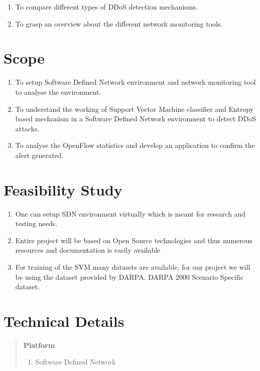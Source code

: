 \documentclass[12pt,a4paper,final]{article}
\begin{document}
\begin{flushleft}
\begin{enumerate}
\item
To compare different types of DDoS detection mechanisms.

\item
To grasp an overview about the different network monitoring tools.
\end{enumerate}

\noindent
\section{Scope}
\begin{enumerate}
\item
To setup Software Defined Network environment and network monitoring tool to analyse the environment.
\item
To understand the working of Support Vector Machine classifier and Entropy based mechanism in a Software Defined Network environment to detect DDoS attacks.
\item
To analyse the OpenFlow statistics and develop an application to confirm the alert generated.
\end{enumerate}

\noindent
\section{Feasibility Study}
\begin{enumerate}
\item
One can setup SDN environment virtually which is meant for research and testing needs.

\item
Entire project will be based on Open Source technologies and thus numerous resources and documentation is easily available

\item
For training of the SVM many datasets are available, for our project we will be using the dataset provided by DARPA.
\linebreak
DARPA 2000 Scenario Specific dataset.
\end{enumerate}

\noindent
\section{Technical Details}
\begin{quotation}
\textbf{Platform} 
\begin{enumerate}
\item
Software Defined Network


\end{enumerate}
\end{quotation}
\end{flushleft}
\end{document}
